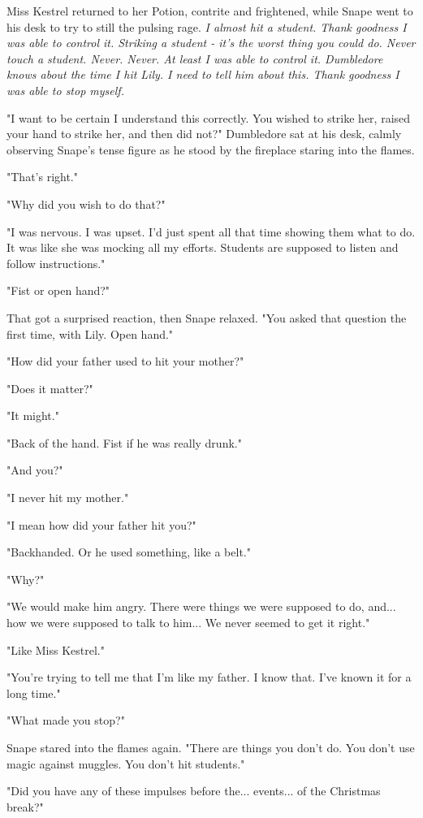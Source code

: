 \documentclass[a4paper,11pt]{article}
\begin{document}
Miss Kestrel returned to her Potion, contrite and frightened, while Snape went to his desk to try to still the pulsing rage. \emph{I almost hit a student. Thank goodness I was able to control it. Striking a student - it's the worst thing you could do. Never touch a student. Never. Never. At least I was able to control it. Dumbledore knows about the time I hit Lily. I need to tell him about this. Thank goodness I was able to stop myself.}

"I want to be certain I understand this correctly. You wished to strike her, raised your hand to strike her, and then did not?" Dumbledore sat at his desk, calmly observing Snape's tense figure as he stood by the fireplace staring into the flames.

"That's right."

"Why did you wish to do that?"

"I was nervous. I was upset. I'd just spent all that time showing them what to do. It was like she was mocking all my efforts. Students are supposed to listen and follow instructions."

"Fist or open hand?"

That got a surprised reaction, then Snape relaxed. "You asked that question the first time, with Lily. Open hand."

"How did your father used to hit your mother?"

"Does it matter?"

"It might."

"Back of the hand. Fist if he was really drunk."

"And you?"

"I never hit my mother."

"I mean how did your father hit you?"

"Backhanded. Or he used something, like a belt."

"Why?"

"We would make him angry. There were things we were supposed to do, and... how we were supposed to talk to him... We never seemed to get it right."

"Like Miss Kestrel."

"You're trying to tell me that I'm like my father. I know that. I've known it for a long time."

"What made you stop?"

Snape stared into the flames again. "There are things you don't do. You don't use magic against muggles. You don't hit students."

"Did you have any of these impulses before the... events... of the Christmas break?"
\end{document}
